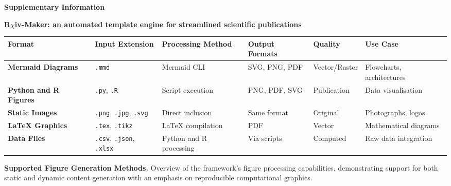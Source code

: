 \renewcommand{\figurename}{Sup. Fig.}
\renewcommand{\tablename}{Sup. Table}
\setcounter{sfigure}{0}
\setcounter{stable}{0}


\newpage
\thispagestyle{empty}
\begin{center}

\vspace*{3cm}

\textbf{\Large Supplementary Information}

\vspace{3cm}

{\Huge\textbf{{\color{red}R}$\chi$iv-Maker: an automated template engine for streamlined scientific publications}}

\vspace{\fill}

\begin{minipage}{\textwidth}
\centering
\end{minipage}

\end{center}
\newpage


\begin{stable*}[ht]
\centering
\footnotesize
\begin{tabularx}{\textwidth}{|l|l|X|X|X|X|}
\hline
\textbf{Format} & \textbf{Input Extension} & \textbf{Processing Method} & \textbf{Output Formats} & \textbf{Quality} & \textbf{Use Case} \\
\hline
\textbf{Mermaid Diagrams} & \texttt{.mmd} & Mermaid CLI & SVG, PNG, PDF & Vector/Raster & Flowcharts, architectures \\
\hline
\textbf{Python and R Figures} & \texttt{.py}, \texttt{.R} & Script execution & PNG, PDF, SVG & Publication & Data visualisation \\
\hline
\textbf{Static Images} & \texttt{.png}, \texttt{.jpg}, \texttt{.svg} & Direct inclusion & Same format & Original & Photographs, logos \\
\hline
\textbf{LaTeX Graphics} & \texttt{.tex}, \texttt{.tikz} & LaTeX compilation & PDF & Vector & Mathematical diagrams \\
\hline
\textbf{Data Files} & \texttt{.csv}, \texttt{.json}, \texttt{.xlsx} & Python and R processing & Via scripts & Computed & Raw data integration \\
\hline
\end{tabularx}
\raggedright
\caption{\textbf{Supported Figure Generation Methods.} Overview of the framework's figure processing capabilities, demonstrating support for both static and dynamic content generation with an emphasis on reproducible computational graphics.}
\label{stable:figure_formats}
\end{stable*}

